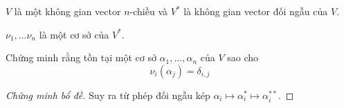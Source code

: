 \documentclass[class=nhvh-linear-algebra,crop=false]{standalone}
\begin{document}
\begin{lemma}
    \par $V$ là một không gian vector $n$-chiều và ${V}^{*}$ là không gian vector đối ngẫu của $V$.
    \par ${\nu}_{1}, \ldots {\nu}_{n}$ là một cơ sở của ${V}^{*}$.
    \par Chứng minh rằng tồn tại một cơ sở $\alpha_{1}, \ldots, \alpha_{n}$ của $V$ sao cho
    \[
        {\nu}_{i}(\alpha_{j}) = \delta_{i,j}
    \]
\end{lemma}

\begin{proof}[Chứng minh bổ đề]
    \par Suy ra từ phép đối ngẫu kép $\alpha_{i} \mapsto {\alpha}^{*}_{i} \mapsto {\alpha}^{**}_{i}$.
\end{proof}
\end{document}
